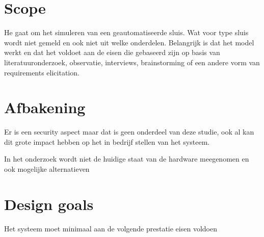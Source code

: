\section{Scope}
	He gaat om het simuleren van een geautomatiseerde sluis. Wat voor type sluis wordt niet gemeld en ook niet uit welke onderdelen. Belangrijk is dat het model werkt en dat het voldoet aan de eisen die gebaseerd zijn op basis van literatuuronderzoek, observatie, interviews, brainstorming of een andere vorm van requirements elicitation.


\section{Afbakening}


Er is een security aspect maar dat is geen onderdeel van deze studie, ook al kan dit grote impact hebben op het in bedrijf stellen van het systeem.

In het onderzoek wordt niet de huidige staat van de hardware meegenomen en ook mogelijke alternatieven 



\section{Design goals}
Het systeem moet minimaal aan de volgende prestatie eisen voldoen 

